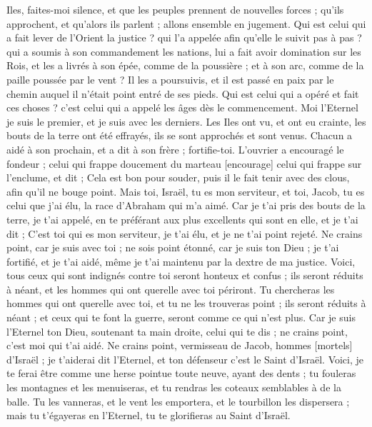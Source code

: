 \begin{multicols}{2}
\VerseOne{}Iles, faites-moi silence, et que les peuples prennent de nouvelles forces ; qu'ils approchent, et qu'alors ils parlent ; allons ensemble en jugement.
Qui est celui qui a fait lever de l'Orient la justice ? qui l'a appelée afin qu'elle le suivit pas à pas ? qui a soumis à son commandement les nations, lui a fait avoir domination sur les Rois, et les a livrés à son épée, comme de la poussière ; et à son arc, comme de la paille poussée par le vent ?
Il les a poursuivis, et il est passé en paix par le chemin auquel il n'était point entré de ses pieds.
Qui est celui qui a opéré et fait ces choses ? c'est celui qui a appelé les âges dès le commencement. Moi l'Eternel je suis le premier, et je suis avec les derniers.
Les Iles ont vu, et ont eu crainte, les bouts de la terre ont été effrayés, ils se sont approchés et sont venus.
Chacun a aidé à son prochain, et a dit à son frère ; fortifie-toi.
L'ouvrier a encouragé le fondeur ; celui qui frappe doucement du marteau [encourage] celui qui frappe sur l'enclume, et dit ; Cela est bon pour souder, puis il le fait tenir avec des clous, afin qu'il ne bouge point.
Mais toi, Israël, tu es mon serviteur, et toi, Jacob, tu es celui que j'ai élu, la race d'Abraham qui m'a aimé.
Car je t'ai pris des bouts de la terre, je t'ai appelé, en te préférant aux plus excellents qui sont en elle, et je t'ai dit ; C'est toi qui es mon serviteur, je t'ai élu, et je ne t'ai point rejeté.
Ne crains point, car je suis avec toi ; ne sois point étonné, car je suis ton Dieu ; je t'ai fortifié, et je t'ai aidé, même je t'ai maintenu par la dextre de ma justice.
Voici, tous ceux qui sont indignés contre toi seront honteux et confus ; ils seront réduits à néant, et les hommes qui ont querelle avec toi périront.
Tu chercheras les hommes qui ont querelle avec toi, et tu ne les trouveras point ; ils seront réduits à néant ; et ceux qui te font la guerre, seront comme ce qui n'est plus.
Car je suis l'Eternel ton Dieu, soutenant ta main droite, celui qui te dis ; ne crains point, c'est moi qui t'ai aidé.
Ne crains point, vermisseau de Jacob, hommes [mortels] d'Israël ; je t'aiderai dit l'Eternel, et ton défenseur c'est le Saint d'Israël.
Voici, je te ferai être comme une herse pointue toute neuve, ayant des dents ; tu fouleras les montagnes et les menuiseras, et tu rendras les coteaux semblables à de la balle.
Tu les vanneras, et le vent les emportera, et le tourbillon les dispersera ; mais tu t'égayeras en l'Eternel, tu te glorifieras au Saint d'Israël.

\end{multicols}
